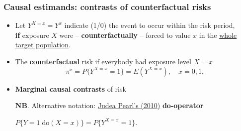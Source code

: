 \documentclass[12pt,dvipsnames,t,aspectratio=169, handout%
]{beamer}
\begin{document}
\begin{frame}
\frametitle{\large Causal estimands: contrasts of counterfactual risks}
\begin{itemize}
\item
Let $Y^{X=x} = Y^x$ %
indicate (1/0) the event to occur within the risk period, \\
\medskip
\textbf{if} exposure $X$ were 
-- \textbf{counterfactually} -- forced
to value $x$ in the \underline{whole target population}. 
\pause
\medskip
\item
The {\bf counterfactual} risk if everybody had exposure level $X=x$
$$  \pi^x = P \{ Y^{X=x} = 1 \} = E(Y^{X=x}), \quad x=0,1. $$ %
\pause
\item
{\bf Marginal causal contrasts} of risk %
\medskip
{}
\pause
\medskip
\item[\textbf{NB}.]
Alternative notation: \href{https://doi.org/10.2202/1557-4679.1203}{\color{blue}Judea Pearl's (2010)} {\bf do-operator} 
\begin{center}
$ P\{ Y=1| \text{do}(X=x)\} = P \{ Y^{X=x} = 1 \} . $
\end{center}

\end{itemize}  

\end{frame}
\end{document}

